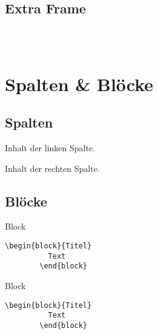   \subsection{Extra Frame}
  \begin{frame}[fragile]{\subsecname}

    \begin{lstlisting}[gobble=6]
      % Option [fragile] ist erforderlich!

      
    \end{lstlisting}

  \end{frame}

\section{Spalten \& Blöcke}

  \subsection{Spalten}
  \begin{frame}{\subsecname}

    \begin{minipage}[t]{0.5\textwidth}
      \par\medskip
      Inhalt der linken Spalte.
    \end{minipage}%
    \begin{minipage}[t]{0.5\textwidth}
      \par\medskip
      Inhalt der rechten Spalte.
    \end{minipage}

  \end{frame}

  \subsection{Blöcke}
  \begin{frame}[fragile]{\subsecname}

    \begin{block}{Block}
      \begin{lstlisting}[gobble=8]
        \begin{block}{Titel}
          Text
        \end{block}
      \end{lstlisting}
    \end{block}

    \begin{block}{Block}
      \begin{lstlisting}[gobble=8]
        \begin{block}{Titel}
          Text
        \end{block}
      \end{lstlisting}
    \end{block}

  \end{frame}

